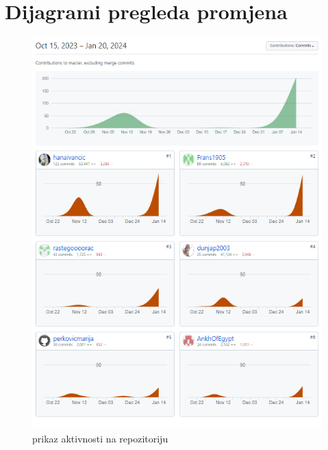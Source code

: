 			\section*{Dijagrami pregleda promjena}
			
			
			\begin{figure}[H]
			\includegraphics[scale=1.0]{slike/githubAktivnost.png} %
			\centering
			\caption{prikaz aktivnosti na repozitoriju}
			\label{prikaz aktivnosti na repozitoriju}
		\end{figure}
		
		\eject